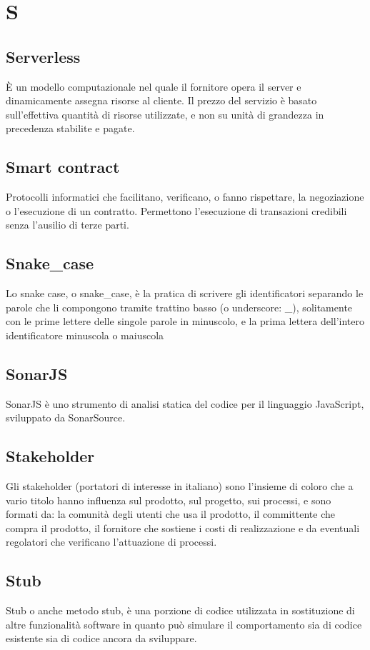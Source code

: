 \clearpage
\section*{S}

\subsection*{Serverless}
È un modello computazionale nel quale il fornitore opera il server e dinamicamente assegna risorse al cliente. Il prezzo del servizio è basato sull'effettiva quantità di risorse utilizzate, e non su unità di grandezza in precedenza stabilite e pagate.

\subsection*{Smart contract}
Protocolli informatici che facilitano, verificano, o fanno rispettare, la negoziazione o l'esecuzione di un contratto. Permettono l'esecuzione di transazioni credibili senza l'ausilio di terze parti.

\subsection*{Snake\_case}
Lo snake case, o snake\_case, è la pratica di scrivere gli identificatori separando le parole che li compongono tramite trattino basso (o underscore: \_), solitamente con le prime lettere delle singole parole in minuscolo, e la prima lettera dell'intero identificatore minuscola o maiuscola

\subsection*{SonarJS}
SonarJS è uno strumento di analisi statica del codice per il linguaggio JavaScript, sviluppato da SonarSource.

\subsection*{Stakeholder}
Gli stakeholder (portatori di interesse in italiano) sono l’insieme di coloro che a vario titolo hanno influenza sul prodotto, sul progetto, sui processi, e sono formati da: la comunità degli utenti che usa il prodotto, il committente che compra il prodotto, il fornitore che sostiene i costi di realizzazione e da eventuali regolatori che verificano l’attuazione di processi.

\subsection*{Stub}
Stub o anche metodo stub, è una porzione di codice utilizzata in sostituzione di altre funzionalità software in quanto può simulare il comportamento sia di codice esistente sia di codice ancora da sviluppare.

